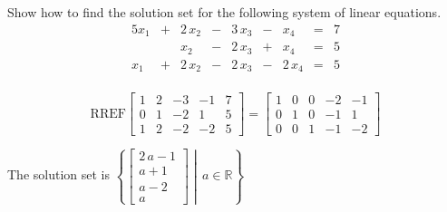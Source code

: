 
\begin{exerciseStatement}


Show how to find the solution set for the following system of linear equations. 
\begin{alignat*}{5} x_{1} &+& 2 \, x_{2} &-& 3 \, x_{3} &-& x_{4} &=& 7 \\ & & x_{2} &-& 2 \, x_{3} &+& x_{4} &=& 5 \\x_{1} &+& 2 \, x_{2} &-& 2 \, x_{3} &-& 2 \, x_{4} &=& 5 \\ \end{alignat*}
            


\end{exerciseStatement}
    
\begin{exerciseAnswer} 
\[\mathrm{RREF} \left[\begin{array}{cccc|c}
1 & 2 & -3 & -1 & 7 \\
0 & 1 & -2 & 1 & 5 \\
1 & 2 & -2 & -2 & 5
\end{array}\right]  =  \left[\begin{array}{cccc|c}
1 & 0 & 0 & -2 & -1 \\
0 & 1 & 0 & -1 & 1 \\
0 & 0 & 1 & -1 & -2
\end{array}\right] \]

The solution set is \( \left\{ \left[\begin{array}{c}
2 \, a - 1 \\
a + 1 \\
a - 2 \\
a
\end{array}\right] \middle|\,a\in\mathbb{R}\right\} \)


\end{exerciseAnswer}
    
